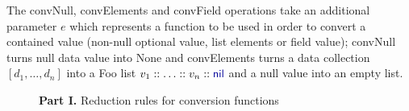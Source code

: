 \documentclass[pldi-cameraready]{sigplanconf-pldi16}
\newcommand{\kvd}[1]{\textnormal{\textcolor{kvdclr}{\sffamily #1}}}
\newcommand{\ident}[1]{\textnormal{\sffamily #1}}
\begin{document}
The \ident{convNull}, \ident{convElements} and \ident{convField} operations take an additional
parameter $e$ which represents a function to be used in order to convert a contained value (non-null
optional value, list elements or field value); \ident{convNull} turns \kvd{null} data value into
\ident{None} and \ident{convElements} turns a data collection $[d_1, \ldots, d_n]$ into a Foo list
$v_1 :: \ldots :: v_n :: \kvd{nil}$ and a \kvd{null} value into an empty list.


\begin{figure}
\noindent
\begin{center}
\textbf{Part I.} Reduction rules for conversion functions
\end{center}


\end{figure}
\end{document}
